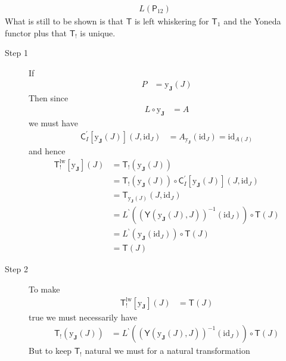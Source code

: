 \begin{prf}
\begin{align*}
  L(\mathsf{P}_{12})
\end{align*}
What is still to be shown is that $\mathsf{T}$ is left whiskering for $\mathsf{T}_{1}$ and the Yoneda functor plus that $\mathsf{T}_{!}$ is unique.
\begin{description}
\item[Step 1]
If
\begin{align*}
  P
  &=
  \mathrm{y}_{\mathbf{J}}(J)
\end{align*}
Then since
\begin{align*}
  L
  \circ
  \mathrm{y}_{\mathbf{J}}
  &=
  A
\end{align*}
we must have
\begin{align*}
  \mathsf{C}_{I}^{\prime}[\mathrm{y}_{\mathbf{J}}(J)](J,\mathrm{id}_{J})
  &=
  A_{\mathrm{y}_{\mathbf{J}}}(\mathrm{id}_{J})
  =
  \mathrm{id}_{A(J)}
\end{align*}
and hence
\begin{align*}
  \mathsf{T}_{!}^{\textrm{lw}}
  \left[
    \mathrm{y}_{\mathbf{J}}
  \right]
  (J)
  &=
  \mathsf{T}_{!}
  \left(
    \mathrm{y}_{\mathbf{J}}(J)
  \right)
  \\
  &=
  \mathsf{T}_{!}
  \left(
    \mathrm{y}_{\mathbf{J}}(J)
  \right)
  \circ
  \mathsf{C}_{I}^{\prime}[\mathrm{y}_{\mathbf{J}}(J)](J,\mathrm{id}_{J})
  \\
  &=
  \mathsf{T}_{\mathrm{y}_{\mathbf{J}}(J)}(J,\mathrm{id}_{J})
  \\
  &=
  L^{\backprime}
  \left(
    (\mathsf{Y}(\mathrm{y}_{\mathbf{J}}(J),J))^{-1}(\mathrm{id}_{J})
  \right)
  \circ
  \mathsf{T}(J)
  \\
  &=
  L^{\backprime}
  \left(
    \mathrm{y}_{\mathbf{J}}(\mathrm{id}_{J})
  \right)
  \circ
  \mathsf{T}(J)
  \\
  &=
  \mathsf{T}(J)
\end{align*}
\item[Step 2]
To make
\begin{align*}
  \mathsf{T}_{!}^{\textrm{lw}}
  \left[
    \mathrm{y}_{\mathbf{J}}
  \right]
  (J)
  &=
  \mathsf{T}(J)
\end{align*}
true we must necessarily have
\begin{align*}
  \mathsf{T}_{!}
  \left(
    \mathrm{y}_{\mathbf{J}}(J)
  \right)
  &=
  L^{\backprime}
  \left(
    (\mathsf{Y}(\mathrm{y}_{\mathbf{J}}(J),J))^{-1}(\mathrm{id}_{J})
  \right)
  \circ
  \mathsf{T}(J)
\end{align*}
But to keep $\mathsf{T}_{!}$ natural we must for a natural transformation
\begin{align*}

\end{align*}
\end{description}
\end{prf}
